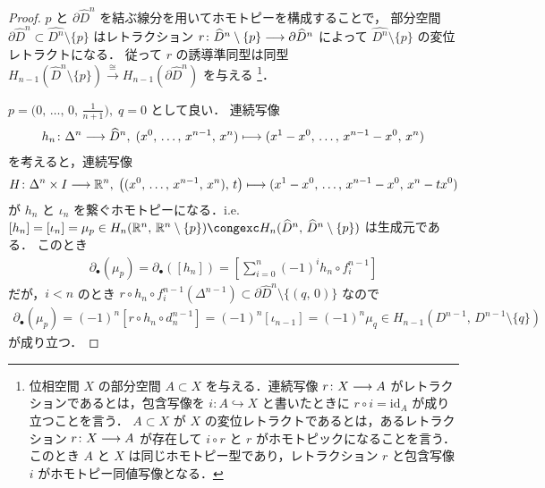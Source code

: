 \documentclass[algtopo_main]{subfiles}
\begin{document}
\begin{proof}
    $p$ と $\partial \widehat{D}^n$ を結ぶ線分を用いてホモトピーを構成することで，
    部分空間 $\partial \widehat{D}^n \subset \widehat{D^n} \setminus \{p\}$ はレトラクション $r \colon \widehat{D}^n \setminus \{p\} \longrightarrow \partial \widehat{D}^n$ によって $\widehat{D^n} \setminus \{p\}$ の変位レトラクトになる．
    従って $r$ の誘導準同型は同型 $H_{n-1} (\widehat{D}^n \setminus \{p\}) \xrightarrow{\cong} H_{n-1}(\partial \widehat{D}^n)$ を与える
    \footnote{
        位相空間 $X$ の部分空間 $A \subset X$ を与える．連続写像 $r \colon X \longrightarrow A$ がレトラクションであるとは，包含写像を $i \colon A \hookrightarrow X$ と書いたときに $r \circ i = \mathrm{id}_A$ が成り立つことを言う．
        $A \subset X$ が $X$ の変位レトラクトであるとは，あるレトラクション $r \colon X \longrightarrow A$ が存在して
        $i \circ r$ と $r$ がホモトピックになることを言う．このとき $A$ と $X$ は同じホモトピー型であり，レトラクション $r$ と包含写像 $i$ がホモトピー同値写像となる．
    }．

    $p = \bigl( 0,\, \dots ,\, 0,\, \frac{1}{n+1} \bigr),\; q = 0$ として良い．
    連続写像
    \begin{align}
        h_n \colon \Delta^n \longrightarrow \widehat{D}^n,\; (x^0,\, \dots ,\, x^{n-1},\, x^n) \longmapsto (x^1 - x^0,\, \dots,\, x^{n-1} - x^0,\, x^n)
    \end{align}
    を考えると，連続写像
    \begin{align}
        H \colon \Delta^n \times I \longrightarrow \mathbb{R}^n,\; \bigl((x^0,\, \dots ,\, x^{n-1},\, x^n),\, t \bigr) \longmapsto (x^1 - x^0,\, \dots,\, x^{n-1} - x^0,\, x^n - tx^0)
    \end{align}
    が $h_n$ と $\iota_n$ を繋ぐホモトピーになる．i.e. $[h_n] = [\iota_n] = \mu_p \in H_n (\mathbb{R}^n,\, \mathbb{R}^n \setminus \{p\}) \congexc H_n (\widehat{D}^n ,\, \widehat{D}^n \setminus \{p\})$ は生成元である．
    このとき
    \begin{align}
        \partial_\bullet (\mu_p) = \partial_\bullet ([h_n]) = \left[ \sum_{i=0}^n (-1)^i h_n \circ f_i^{n-1} \right] 
    \end{align}
    だが，$i < n$ のとき $r \circ h_n \circ f_i^{n-1} (\Delta^{n-1}) \subset \partial \widehat{D}^n \setminus \{(q,\, 0)\}$ なので
    \begin{align}
        \partial_\bullet (\mu_p) = (-1)^n [r \circ h_n \circ d_n^{n-1}] = (-1)^n [\iota_{n-1}] = (-1)^n \mu_q \in H_{n-1} (D^{n-1},\, D^{n-1}\setminus \{q\})
    \end{align}
    が成り立つ．
\end{proof}
\end{document}
